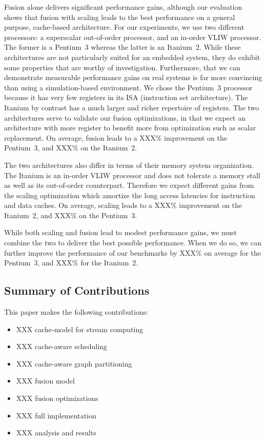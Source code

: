 Fusion alone delivers significant performance gains, although our
evaluation shows that fusion with scaling leads to the best
performance on a general purpose, cache-based architecture. For our
experiments, we use two different processors: a superscalar out-of-order
processor, and an in-order VLIW processor. The former is a Pentium~3
whereas the latter is an Itanium~2. While these architectures are not
particularly suited for an embedded system, they do exhibit some
properties that are worthy of investigation. Furthermore, that we can
demonstrate measurable performance gains on real systems is far more
convincing than using a simulation-based environment. We chose the
Pentium~3 processor because it has very few registers in its ISA
(instruction set architecture). The Itanium by contrast has a much
larger and richer repertoire of registers. The two architectures serve
to validate our fusion optimizations, in that we expect an
architecture with more register to benefit more from optimization such
as scalar replacement. On average, fusion leads to a XXX\% improvement
on the Pentium~3, and XXX\% on the Itanium~2.

The two architectures also differ in terms of their memory system
organization. The Itanium is an in-order VLIW processor and does not
tolerate a memory stall as well as its out-of-order
counterpart. Therefore we expect different gains from the scaling
optimization which amortize the long access latencies for instruction
and data caches. On average, scaling leads to a XXX\% improvement on
the Itanium~2, and XXX\% on the Pentium~3.

While both scaling and fusion lead to modest performance gains, we
must combine the two to deliver the best possible performance. When we
do so, we can further improve the performance of our benchmarks by
XXX\% on average for the Pentium~3, and XXX\% for the Itanium~2.

\subsection{Summary of Contributions}

This paper makes the following contributions:
\begin{itemize}
\item XXX cache-model for stream computing
\item XXX cache-aware scheduling
\item XXX cache-aware graph partitioning
\item XXX fusion model
\item XXX fusion optimizations
\item XXX full implementation 
\item XXX analysis and results
\end{itemize}

